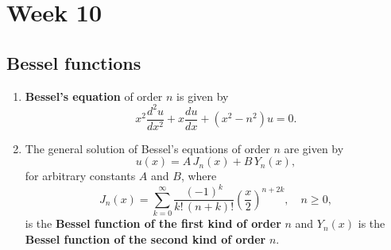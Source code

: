 \chapter{Week 10}
\setcounter{weekpage}{1}
\thispagestyle{plainweek}


\section{Bessel functions}

\begin{enumerate}

    \item \textbf{Bessel's equation} of order $n$ is given by
    \[x^{2}\frac{d^{2}u}{dx^{2}}+x\frac{du}{dx}+(x^{2}-n^{2})u=0.\]

    \item The general solution of Bessel's equations of order $n$ are given by 
    \[u(x) = A \,J_{n}(x) + B\,Y_{n}(x),\]
    for arbitrary constants $A$ and $B$, where
    \[J_{n}(x) = \sum_{k=0}^{\infty}\frac{(-1)^{k}}{k!\,(n+k)!}\left( \frac{x}{2} \right)^{n+2k},\quad n\geq 0,\]
    is the \textbf{Bessel function of the first kind of order} $n$ and $Y_{n}(x)$ is the \textbf{Bessel function of the second kind of order} $n$.





    

\end{enumerate}
